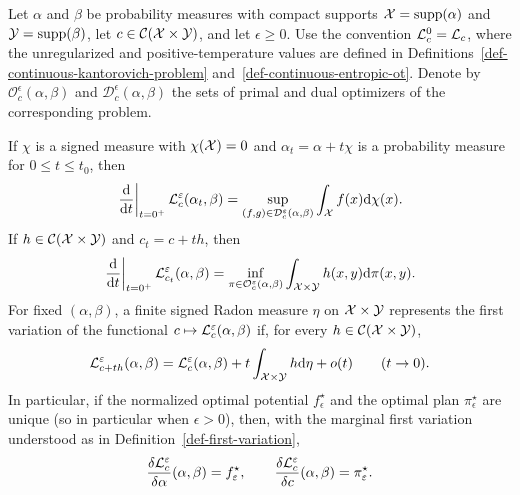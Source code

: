 \begin{prop}\label{prop-ot-first-variations-unregularized}\label{prop-ot-first-variations-entropic}
	Let $\alpha$ and $\beta$ be probability measures with compact supports $\mathcal{X}=\operatorname{supp}(\alpha)$ and $\mathcal{Y}=\operatorname{supp}(\beta)$, let $c\in\mathcal{C}(\mathcal{X}\times\mathcal{Y})$, and let $\epsilon\geq0$. Use the convention $\mathcal{L}_c^0=\mathcal{L}_c$, where the unregularized and positive-temperature values are defined in Definitions~\ref{def-continuous-kantorovich-problem} and~\ref{def-continuous-entropic-ot}. Denote by $\mathcal O_c^\epsilon(\alpha,\beta)$ and $\mathcal D_c^\epsilon(\alpha,\beta)$ the sets of primal and dual optimizers of the corresponding problem.

	If $\chi$ is a signed measure with $\chi(\mathcal{X})=0$ and $\alpha_t=\alpha+t\chi$ is a probability measure for $0\leq t\leq t_0$, then
	\[
		\left.\frac{\mathrm{d}}{\mathrm{d} t}\right|_{t=0^+}
		\mathcal{L}_c^\varepsilon(\alpha_t,\beta)
		=
		\sup_{(f,g)\in\mathcal D_c^\varepsilon(\alpha,\beta)}
		\int_{\mathcal{X}} f(x)\mathrm{d}\chi(x).
	\]
	If $h\in\mathcal{C}(\mathcal{X}\times\mathcal{Y})$ and $c_t=c+th$, then
	\[
		\left.\frac{\mathrm{d}}{\mathrm{d} t}\right|_{t=0^+}
		\mathcal{L}_{c_t}^\varepsilon(\alpha,\beta)
		=
		\inf_{\pi\in\mathcal O_c^\varepsilon(\alpha,\beta)}
		\int_{\mathcal{X}\times\mathcal{Y}} h(x,y)\mathrm{d}\pi(x,y).
	\]
	For fixed $(\alpha,\beta)$, a finite signed Radon measure $\eta$ on $\mathcal{X}\times\mathcal{Y}$ represents the first variation of the functional $c\mapsto\mathcal{L}_c^\varepsilon(\alpha,\beta)$ if, for every $h\in\mathcal{C}(\mathcal{X}\times\mathcal{Y})$,
	\[
		\mathcal{L}_{c+t h}^\varepsilon(\alpha,\beta)
		=
		\mathcal{L}_c^\varepsilon(\alpha,\beta)
		+t\int_{\mathcal{X}\times\mathcal{Y}}h\mathrm{d}\eta+o(t)
		\qquad(t\to0).
	\]
	In particular, if the normalized optimal potential $f_\epsilon^\star$ and the optimal plan $\pi_\epsilon^\star$ are unique (so in particular when $\epsilon>0$), then, with the marginal first variation understood as in Definition~\ref{def-first-variation},
	\[
		\frac{\delta \mathcal{L}_c^\varepsilon}{\delta\alpha}(\alpha,\beta)=f_\varepsilon^\star,
		\qquad
		\frac{\delta \mathcal{L}_c^\varepsilon}{\delta c}(\alpha,\beta)=\pi_\varepsilon^\star.
	\]
\end{prop}
